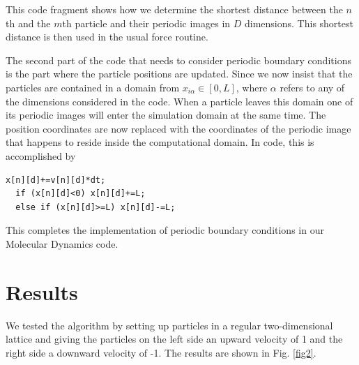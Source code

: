 \documentclass{article}
\begin{document}
This code fragment shows how we determine the shortest distance between the $n$th and the $m$th particle and their periodic images in $D$ dimensions. This shortest distance is then used in the usual force routine.

The second part of the code that needs to consider periodic boundary conditions is the part where the particle positions are updated. Since we now insist that the particles are contained in a domain from $x_{i\alpha}\in[0,L]$, where $\alpha$ refers to any of the dimensions considered in the code. When a particle leaves this domain one of its periodic images will enter the simulation domain at the same time. The position coordinates are now replaced with the coordinates of the periodic image that happens to reside inside the computational domain. In code, this is accomplished by

\begin{lstlisting}[frame=single]
  x[n][d]+=v[n][d]*dt;
  if (x[n][d]<0) x[n][d]+=L;
  else if (x[n][d]>=L) x[n][d]-=L;
\end{lstlisting}

This completes the implementation of periodic boundary conditions in our Molecular Dynamics code. 

\section{Results}
We tested the algorithm by setting up particles in a regular two-dimensional lattice and giving the particles on the left side an upward velocity of 1 and the right side a downward velocity of -1. The results are shown in Fig. \ref{fig2}.
\end{document}
